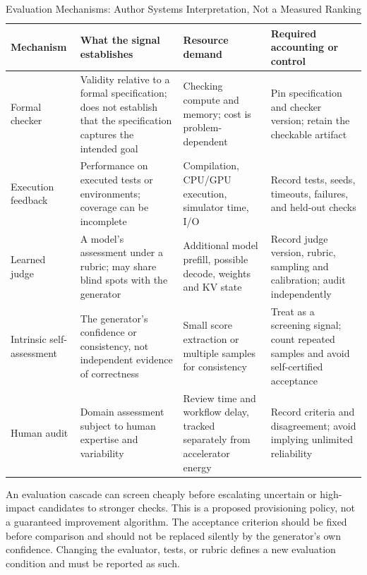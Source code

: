 \documentclass[journal]{IEEEtran}
\begin{document}
\begin{table}[t]
\caption{Evaluation Mechanisms: Author Systems Interpretation, Not a Measured Ranking}
\label{tab:evaluation}
\centering
\scriptsize
\begin{tabularx}{\textwidth}{@{}p{}p{}p{}X@{}}
\toprule
Mechanism & What the signal establishes & Resource demand & Required accounting or control \\
\midrule
Formal checker & Validity relative to a formal specification; does not establish that the specification captures the intended goal & Checking compute and memory; cost is problem-dependent & Pin specification and checker version; retain the checkable artifact \\
Execution feedback & Performance on executed tests or environments; coverage can be incomplete & Compilation, CPU/GPU execution, simulator time, I/O & Record tests, seeds, timeouts, failures, and held-out checks \\
Learned judge & A model's assessment under a rubric; may share blind spots with the generator & Additional model prefill, possible decode, weights and KV state & Record judge version, rubric, sampling and calibration; audit independently \\
Intrinsic self-assessment & The generator's confidence or consistency, not independent evidence of correctness & Small score extraction or multiple samples for consistency & Treat as a screening signal; count repeated samples and avoid self-certified acceptance \\
Human audit & Domain assessment subject to human expertise and variability & Review time and workflow delay, tracked separately from accelerator energy & Record criteria and disagreement; avoid implying unlimited reliability \\
\bottomrule
\end{tabularx}
\end{table}

An evaluation cascade can screen cheaply before escalating uncertain or high-impact candidates to stronger checks. This is a proposed provisioning policy, not a guaranteed improvement algorithm. The acceptance criterion should be fixed before comparison and should not be replaced silently by the generator's own confidence. Changing the evaluator, tests, or rubric defines a new evaluation condition and must be reported as such.
\end{document}
